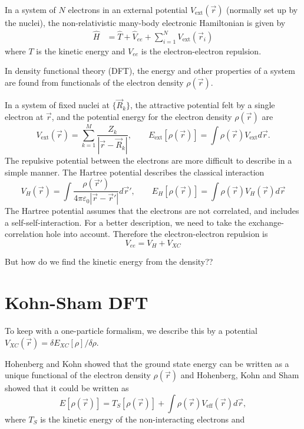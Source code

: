 \documentclass[11pt]{scrbook}   %
\begin{document}
In a system of $N$ electrons in an external potential $V_{\text{ext}}(\vec{r})$ 
(normally set up by the nuclei), the non-relativistic many-body electronic 
Hamiltonian is given by 
\begin{align}
  \hat{H} &= \hat{T} + \hat{V}_{ee} + \sum_{i=1}^N V_{\text{ext}}(\vec{r}_i)
  \label{eq:hamiltonian}
\end{align}
where $T$ is the kinetic energy and $V_{ee}$ is the electron-electron repulsion.

In density functional theory (DFT), the energy and other properties of a 
system are found from functionals of the electron density $\rho(\vec{r})$.

In a system of fixed nuclei at $\{\vec{R}_k\}$, the attractive potential 
felt by a single electron at $\vec{r}$, and the potential energy for the 
electron density $\rho(\vec{r})$ are
\begin{equation}
  V_{\text{ext}}(\vec{r}) = \sum_{k=1}^M \frac{Z_k}{
  |\vec{r}-\vec{R}_k|}
  ,\qquad
  E_{\text{ext}}[\rho(\vec{r})] = \int\rho(\vec{r})V_{\text{ext}}d\vec{r}.
  \label{eq:nuclei-pot}
\end{equation}
The repulsive potential between the electrons are more difficult to describe in
a simple manner. The Hartree potential describes the classical interaction
\begin{equation}
  V_H(\vec{r}) = \int\frac{\rho(\vec{r}')}{4\pi\varepsilon_0|\vec{r}-\vec{r}'|}
  d\vec{r}',\qquad
  E_{H}[\rho(\vec{r})] = \int \rho(\vec{r}) V_H(\vec{r}) d\vec{r}
  \label{eq:hartree-pot}
\end{equation}
The Hartree potential assumes that the electrons are not correlated, and
includes a self-self-interaction. For a better description, we need to take
the exchange-correlation hole into account\cite{Sutton:1993}. Therefore the
electron-electron repulsion is
\begin{equation}
  V_{ee} = V_H + V_{XC}
\end{equation}

But how do we find the kinetic energy from the density??

\section{Kohn-Sham DFT}

To keep with a
one-particle formalism, we describe this by a potential $V_{XC}(\vec{r}) = 
\delta E_{XC}[\rho]/\delta \rho$.

Hohenberg and Kohn showed that the ground state energy can be written as a
unique functional of the electron density
$\rho(\vec{r})$\cite{HohenbergKohn:1964} and Hohenberg, Kohn and Sham 
showed\cite{HohenbergKohn:1964,KohnSham:1965} that it could be written as 
\begin{equation}
  E[\rho(\vec{r})] = T_S[\rho(\vec{r})] + 
  \int \rho(\vec{r})
  V_{\text{eff}}(\vec{r})d\vec{r},
  \label{eq:kohnshamfunc}
\end{equation}
where $T_S$ is the kinetic energy of the non-interacting electrons and
\end{document}
